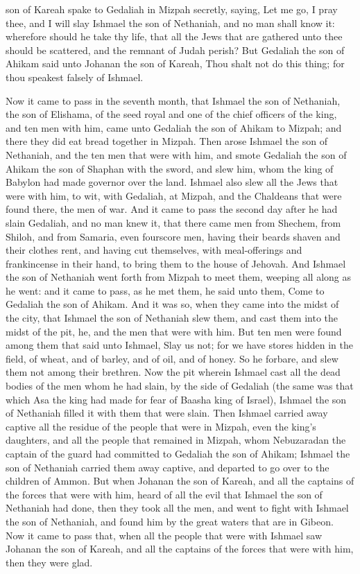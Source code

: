 son of Kareah spake to Gedaliah in Mizpah secretly, saying, Let me go, I pray thee, and I will slay Ishmael the son of Nethaniah, and no man shall know it: wherefore should he take thy life, that all the Jews that are gathered unto thee should be scattered, and the remnant of Judah perish? But Gedaliah the son of Ahikam said unto Johanan the son of Kareah, Thou shalt not do this thing; for thou speakest falsely of Ishmael. 

Now it came to pass in the seventh month, that Ishmael the son of Nethaniah, the son of Elishama, of the seed royal and one of the chief officers of the king, and ten men with him, came unto Gedaliah the son of Ahikam to Mizpah; and there they did eat bread together in Mizpah. Then arose Ishmael the son of Nethaniah, and the ten men that were with him, and smote Gedaliah the son of Ahikam the son of Shaphan with the sword, and slew him, whom the king of Babylon had made governor over the land. Ishmael also slew all the Jews that were with him, to wit, with Gedaliah, at Mizpah, and the Chaldeans that were found there, the men of war.  And it came to pass the second day after he had slain Gedaliah, and no man knew it, that there came men from Shechem, from Shiloh, and from Samaria, even fourscore men, having their beards shaven and their clothes rent, and having cut themselves, with meal-offerings and frankincense in their hand, to bring them to the house of Jehovah. And Ishmael the son of Nethaniah went forth from Mizpah to meet them, weeping all along as he went: and it came to pass, as he met them, he said unto them, Come to Gedaliah the son of Ahikam. And it was so, when they came into the midst of the city, that Ishmael the son of Nethaniah slew them, and cast them into the midst of the pit, he, and the men that were with him. But ten men were found among them that said unto Ishmael, Slay us not; for we have stores hidden in the field, of wheat, and of barley, and of oil, and of honey. So he forbare, and slew them not among their brethren. Now the pit wherein Ishmael cast all the dead bodies of the men whom he had slain, by the side of Gedaliah (the same was that which Asa the king had made for fear of Baasha king of Israel), Ishmael the son of Nethaniah filled it with them that were slain. Then Ishmael carried away captive all the residue of the people that were in Mizpah, even the king’s daughters, and all the people that remained in Mizpah, whom Nebuzaradan the captain of the guard had committed to Gedaliah the son of Ahikam; Ishmael the son of Nethaniah carried them away captive, and departed to go over to the children of Ammon.  But when Johanan the son of Kareah, and all the captains of the forces that were with him, heard of all the evil that Ishmael the son of Nethaniah had done, then they took all the men, and went to fight with Ishmael the son of Nethaniah, and found him by the great waters that are in Gibeon. Now it came to pass that, when all the people that were with Ishmael saw Johanan the son of Kareah, and all the captains of the forces that were with him, then they were glad. 